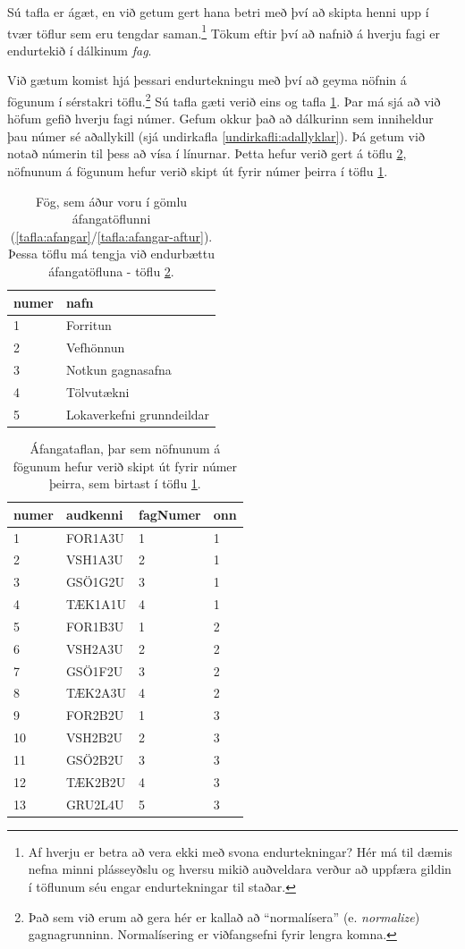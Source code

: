 Sú tafla er ágæt, en við getum gert hana betri með því að skipta henni upp í tvær töflur sem eru tengdar saman.\footnote{Af hverju er betra að vera ekki með svona endurtekningar? Hér má til dæmis nefna minni plásseyðslu og hversu mikið auðveldara verður að uppfæra gildin í töflunum séu engar endurtekningar til staðar.} Tökum eftir því að nafnið á hverju fagi er endurtekið í dálkinum \emph{fag}. 

Við gætum komist hjá þessari endurtekningu með því að geyma nöfnin á fögunum í sérstakri töflu.\footnote{Það sem við erum að gera hér er kallað að ``normalísera'' (e. \emph{normalize}) gagnagrunninn. Normalísering er viðfangsefni fyrir lengra komna.} Sú tafla gæti verið eins og tafla \ref{tafla:fog}.
Þar má sjá að við höfum gefið hverju fagi númer. Gefum okkur það að dálkurinn sem inniheldur þau númer sé aðallykill (sjá undirkafla \ref{undirkafli:adallyklar}). Þá getum við notað númerin til þess að vísa í línurnar. Þetta hefur verið gert á töflu \ref{tafla:afangar-fagnumer}, nöfnunum á fögunum hefur verið skipt út fyrir númer þeirra í töflu \ref{tafla:fog}.

\begin{table}
\centering
\caption[Fög]{Fög, sem áður voru í gömlu áfangatöflunni (\ref{tafla:afangar}/\ref{tafla:afangar-aftur}). Þessa töflu má tengja við endurbættu áfangatöfluna - töflu \ref{tafla:afangar-fagnumer}.}
\label{tafla:fog}
\begin{tabular}{ll}
\toprule
numer&nafn\\
\midrule
1&Forritun\\
2&Vefhönnun\\
3&Notkun gagnasafna\\
4&Tölvutækni\\
5&Lokaverkefni grunndeildar\\
\bottomrule
\end{tabular}
\end{table}

\begin{table}
\centering
\caption[Áfangar - endurbætt]{Áfangataflan, þar sem nöfnunum á fögunum hefur verið skipt út fyrir númer þeirra, sem birtast í töflu \ref{tafla:fog}.}
\label{tafla:afangar-fagnumer}
\begin{tabular}{llll}
\toprule
numer&audkenni&fagNumer&onn\\
\midrule
1&	FOR1A3U&	1&	1\\
2&	VSH1A3U&	2&	1\\
3&	GSÖ1G2U&	3&	1\\
4&	TÆK1A1U&	4&	1\\
5&	FOR1B3U&	1&	2\\
6&	VSH2A3U&	2&	2\\
7&	GSÖ1F2U&	3&	2\\
8&	TÆK2A3U&	4&	2\\
9&	FOR2B2U&	1&	3\\
10&	VSH2B2U&	2&	3\\
11&	GSÖ2B2U&	3&	3\\
12&	TÆK2B2U&	4&	3\\
13&	GRU2L4U&	5&	3\\
\bottomrule
\end{tabular}
\end{table}

